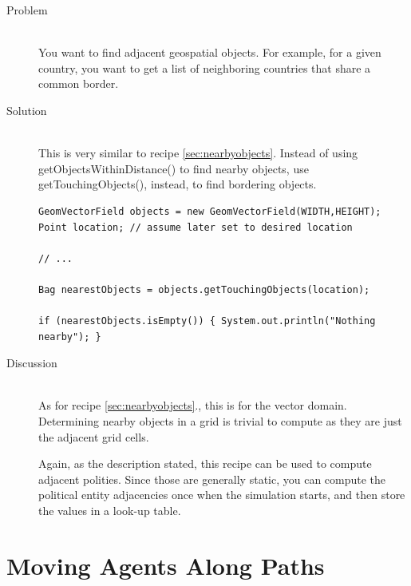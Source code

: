 \documentclass[twoside,10pt]{book}
\newcommand\method[1]{\textsf{#1}}
\begin{document}
\begin{description}
\item[Problem]~\\
You want to find adjacent geospatial objects. For example, for a given
country, you want to get a list of neighboring countries that share a
common border.

\item[Solution]~\\
This is very similar to recipe \ref{sec:nearbyobjects}.  Instead of
using \method{getObjectsWithinDistance()}  to find nearby objects, use
\method{getTouchingObjects()}, instead, to find bordering objects.
\begin{Verbatim}[frame=lines,framesep=5mm,commandchars=+\[\]]
GeomVectorField objects = new GeomVectorField(WIDTH,HEIGHT);
Point location; // assume later set to desired location

// ...
	
Bag nearestObjects = objects.getTouchingObjects(location);

if (nearestObjects.isEmpty()) { System.out.println("Nothing nearby"); }
\end{Verbatim}

\item[Discussion]~\\
  As for recipe \ref{sec:nearbyobjects}., this is for the vector
  domain.  Determining nearby objects in a grid is trivial to compute
  as they are just the adjacent grid cells.

  Again, as the description stated, this recipe can be used to compute
  adjacent polities.  Since those are generally static, you can
  compute the political entity adjacencies once when the simulation
  starts, and then store the values in a look-up table.
\end{description}


\section{Moving Agents Along Paths}
\label{sec:movingalongpaths}
\end{document}
